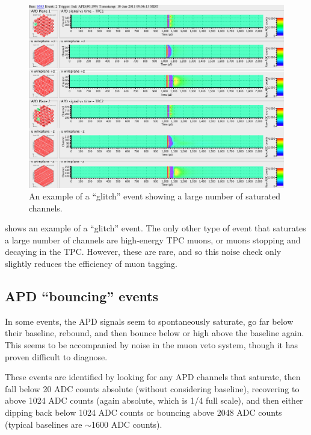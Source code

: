 \documentclass[herrin-thesis.tex]{subfiles}
\begin{document}
\begin{figure}[tbp]
\centering
\includegraphics[width=\columnwidth]{./plots/noise_eventdisplay_run_1683_ev_0002.png}
\caption[``Glitch'' noise]{An example of a ``glitch'' event showing a large number of saturated channels.}
\label{fig:noise_glitch}
\end{figure}

 shows an example of a ``glitch'' event. The only other type of event that saturates a large number of channels are high-energy TPC muons, or  muons stopping and decaying in the TPC. However, these are rare, and so this noise check only slightly reduces the efficiency of muon tagging.

\subsection{APD ``bouncing'' events}
In some events, the APD signals seem to spontaneously saturate, go far below their baseline, rebound, and then bounce below or high above the baseline again. This seems to be accompanied by noise in the muon veto system, though it has proven difficult to diagnose.

These events are identified by looking for any APD channels that saturate, then fall below 20 ADC counts absolute (without considering baseline), recovering to above 1024 ADC counts (again absolute, which is 1/4 full scale), and then either dipping back below 1024 ADC counts or bouncing above 2048 ADC counts (typical baselines are \(\sim\)1600 ADC counts). 
\end{document}
